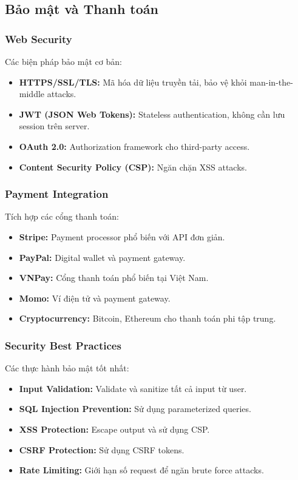 \documentclass[a4paper,12pt]{report}
\begin{document}
\subsection{Bảo mật và Thanh toán}

\subsubsection{Web Security}
Các biện pháp bảo mật cơ bản:
\begin{itemize}
    \item \textbf{HTTPS/SSL/TLS:} Mã hóa dữ liệu truyền tải, bảo vệ khỏi man-in-the-middle attacks.
    \item \textbf{JWT (JSON Web Tokens):} Stateless authentication, không cần lưu session trên server.
    \item \textbf{OAuth 2.0:} Authorization framework cho third-party access.
    \item \textbf{Content Security Policy (CSP):} Ngăn chặn XSS attacks.
\end{itemize}

\subsubsection{Payment Integration}
Tích hợp các cổng thanh toán:
\begin{itemize}
    \item \textbf{Stripe:} Payment processor phổ biến với API đơn giản.
    \item \textbf{PayPal:} Digital wallet và payment gateway.
    \item \textbf{VNPay:} Cổng thanh toán phổ biến tại Việt Nam.
    \item \textbf{Momo:} Ví điện tử và payment gateway.
    \item \textbf{Cryptocurrency:} Bitcoin, Ethereum cho thanh toán phi tập trung.
\end{itemize}

\subsubsection{Security Best Practices}
Các thực hành bảo mật tốt nhất:
\begin{itemize}
    \item \textbf{Input Validation:} Validate và sanitize tất cả input từ user.
    \item \textbf{SQL Injection Prevention:} Sử dụng parameterized queries.
    \item \textbf{XSS Protection:} Escape output và sử dụng CSP.
    \item \textbf{CSRF Protection:} Sử dụng CSRF tokens.
    \item \textbf{Rate Limiting:} Giới hạn số request để ngăn brute force attacks.
\end{itemize}
\end{document}
